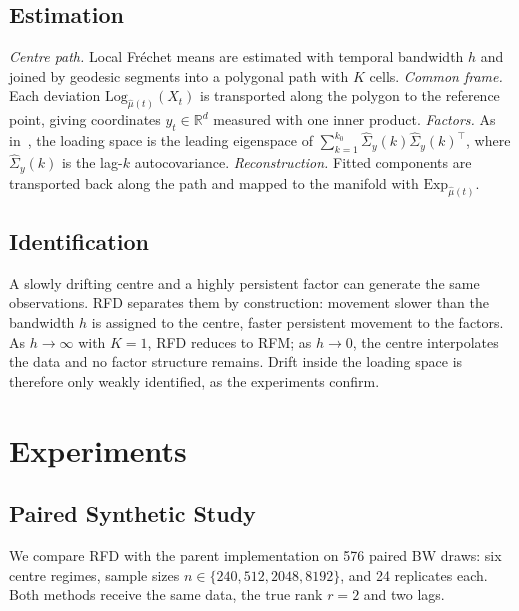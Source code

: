 \documentclass[journal]{IEEEtran}
\newcommand{\Exp}{\mathrm{Exp}}
\newcommand{\Log}{\mathrm{Log}}
\begin{document}
\subsection{Estimation}
\emph{Centre path.} Local Fr\'echet means are estimated with temporal
bandwidth $h$ and joined by geodesic segments into a polygonal path with
$K$ cells.
\emph{Common frame.} Each deviation $\Log_{\hat\mu(t)}(X_t)$ is transported
along the polygon to the reference point, giving coordinates
$y_t\in\mathbb{R}^{d}$ measured with one inner product.
\emph{Factors.} As in~\cite{lamyao2012,huang2026rfm}, the loading space is
the leading eigenspace of $\sum_{k=1}^{k_0}\hat\Sigma_y(k)\hat\Sigma_y(k)^\top$,
where $\hat\Sigma_y(k)$ is the lag-$k$ autocovariance.
\emph{Reconstruction.} Fitted components are transported back along the
path and mapped to the manifold with $\Exp_{\hat\mu(t)}$.

\subsection{Identification}
A slowly drifting centre and a highly persistent factor can generate the
same observations. RFD separates them by construction: movement slower
than the bandwidth $h$ is assigned to the centre, faster persistent
movement to the factors. As $h\to\infty$ with $K=1$, RFD reduces to RFM;
as $h\to0$, the centre interpolates the data and no factor structure
remains. Drift inside the loading space is therefore only weakly
identified, as the experiments confirm.

\section{Experiments}\label{sec:exp}

\subsection{Paired Synthetic Study}
We compare RFD with the parent implementation on 576 paired BW draws:
six centre regimes, sample sizes $n\in\{240,512,2048,8192\}$, and 24
replicates each. Both methods receive the same data, the true rank $r=2$
and two lags.
\end{document}
